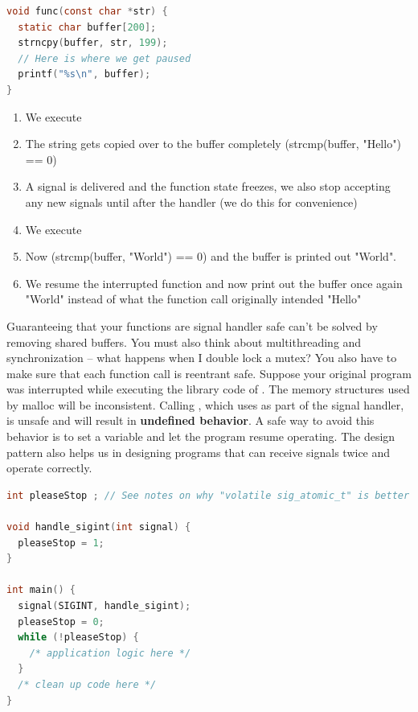 \begin{lstlisting}[language=C]
void func(const char *str) {
  static char buffer[200];
  strncpy(buffer, str, 199);
  // Here is where we get paused
  printf("%s\n", buffer);
}
\end{lstlisting}

\begin{enumerate}
\item We execute 
\item The string gets copied over to the buffer completely (strcmp(buffer, "Hello") == 0)
\item A signal is delivered and the function state freezes, we also stop accepting any new signals until after the handler (we do this for convenience)
\item We execute 
\item Now (strcmp(buffer, "World") == 0) and the buffer is printed out "World".
\item We resume the interrupted function and now print out the buffer once again "World" instead of what the function call originally intended "Hello"
\end{enumerate}

Guaranteeing that your functions are signal handler safe can't be solved by removing shared buffers.
You must also think about multithreading and synchronization -- what happens when I double lock a mutex?
You also have to make sure that each function call is reentrant safe.
Suppose your original program was interrupted while executing the library code of .
The memory structures used by malloc will be inconsistent.
Calling , which uses  as part of the signal handler, is unsafe and will result in \textbf{undefined behavior}.
A safe way to avoid this behavior is to set a variable and let the program resume operating.
The design pattern also helps us in designing programs that can receive signals twice and operate correctly.

\begin{lstlisting}[language=C]
int pleaseStop ; // See notes on why "volatile sig_atomic_t" is better

void handle_sigint(int signal) {
  pleaseStop = 1;
}

int main() {
  signal(SIGINT, handle_sigint);
  pleaseStop = 0;
  while (!pleaseStop) {
    /* application logic here */
  }
  /* clean up code here */
}
\end{lstlisting}

